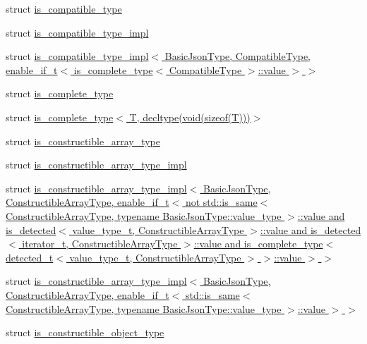 \begin{DoxyCompactItemize}
struct \hyperlink{structnlohmann_1_1detail_1_1is__compatible__type}{is\+\_\+compatible\+\_\+type}
\item 
struct \hyperlink{structnlohmann_1_1detail_1_1is__compatible__type__impl}{is\+\_\+compatible\+\_\+type\+\_\+impl}
\item 
struct \hyperlink{structnlohmann_1_1detail_1_1is__compatible__type__impl_3_01BasicJsonType_00_01CompatibleType_00_fa54cb60e66f5c6ba93b1dd3f418b703}{is\+\_\+compatible\+\_\+type\+\_\+impl$<$ Basic\+Json\+Type, Compatible\+Type, enable\+\_\+if\+\_\+t$<$ is\+\_\+complete\+\_\+type$<$ Compatible\+Type $>$\+::value $>$ $>$}
\item 
struct \hyperlink{structnlohmann_1_1detail_1_1is__complete__type}{is\+\_\+complete\+\_\+type}
\item 
struct \hyperlink{structnlohmann_1_1detail_1_1is__complete__type_3_01T_00_01decltype_07void_07sizeof_07T_08_08_08_4}{is\+\_\+complete\+\_\+type$<$ T, decltype(void(sizeof(\+T)))$>$}
\item 
struct \hyperlink{structnlohmann_1_1detail_1_1is__constructible__array__type}{is\+\_\+constructible\+\_\+array\+\_\+type}
\item 
struct \hyperlink{structnlohmann_1_1detail_1_1is__constructible__array__type__impl}{is\+\_\+constructible\+\_\+array\+\_\+type\+\_\+impl}
\item 
struct \hyperlink{structnlohmann_1_1detail_1_1is__constructible__array__type__impl_3_01BasicJsonType_00_01Construc77059e54a799f3816dfc60229a9bf59d}{is\+\_\+constructible\+\_\+array\+\_\+type\+\_\+impl$<$ Basic\+Json\+Type, Constructible\+Array\+Type, enable\+\_\+if\+\_\+t$<$ not std\+::is\+\_\+same$<$ Constructible\+Array\+Type, typename Basic\+Json\+Type\+::value\+\_\+type $>$\+::value and is\+\_\+detected$<$ value\+\_\+type\+\_\+t, Constructible\+Array\+Type $>$\+::value and is\+\_\+detected$<$ iterator\+\_\+t, Constructible\+Array\+Type $>$\+::value and is\+\_\+complete\+\_\+type$<$ detected\+\_\+t$<$ value\+\_\+type\+\_\+t, Constructible\+Array\+Type $>$ $>$\+::value $>$ $>$}
\item 
struct \hyperlink{structnlohmann_1_1detail_1_1is__constructible__array__type__impl_3_01BasicJsonType_00_01Construce6fa33688da703b95649da4749cdeb98}{is\+\_\+constructible\+\_\+array\+\_\+type\+\_\+impl$<$ Basic\+Json\+Type, Constructible\+Array\+Type, enable\+\_\+if\+\_\+t$<$ std\+::is\+\_\+same$<$ Constructible\+Array\+Type, typename Basic\+Json\+Type\+::value\+\_\+type $>$\+::value $>$ $>$}
\item 
struct \hyperlink{structnlohmann_1_1detail_1_1is__constructible__object__type}{is\+\_\+constructible\+\_\+object\+\_\+type}

\end{DoxyCompactItemize}
